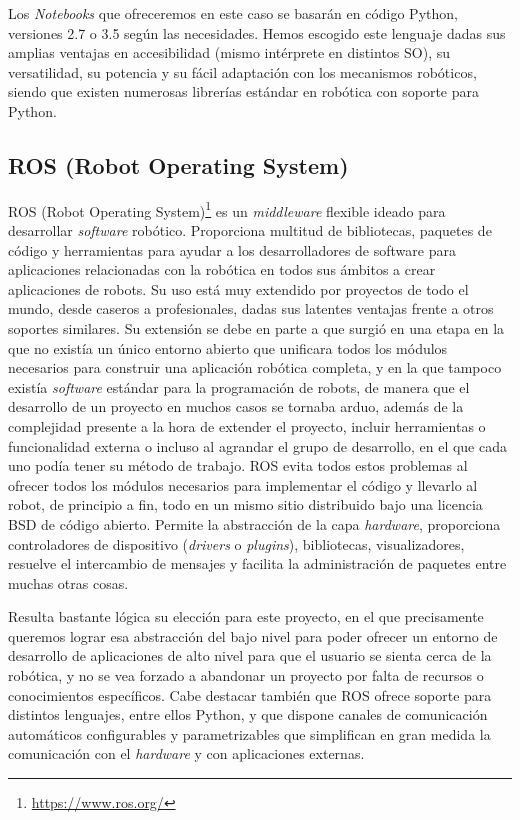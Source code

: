 Los \textit{Notebooks} que ofreceremos en este caso se basarán en código Python, versiones 2.7 o 3.5 según las necesidades. Hemos escogido este lenguaje dadas sus amplias ventajas en accesibilidad (mismo intérprete en distintos SO), su versatilidad, su potencia y su fácil adaptación con los mecanismos robóticos, siendo que existen numerosas librerías estándar en robótica con soporte para Python.

\subsection{ROS (Robot Operating System)}

ROS (Robot Operating System)\footnote{\url{https://www.ros.org/}} es un \textit{middleware} flexible ideado para desarrollar \textit{software} robótico. Proporciona multitud de bibliotecas, paquetes de código y herramientas para ayudar a los desarrolladores de software para aplicaciones relacionadas con la robótica en todos sus ámbitos a crear aplicaciones de robots. Su uso está muy extendido por proyectos de todo el mundo, desde caseros a profesionales, dadas sus latentes ventajas frente a otros soportes similares. Su extensión se debe en parte a que surgió en una etapa en la que no existía un único entorno abierto que unificara todos los módulos necesarios para construir una aplicación robótica completa, y en la que tampoco existía \textit{software} estándar para la programación de robots, de manera que el desarrollo de un proyecto en muchos casos se tornaba arduo, además de la complejidad presente a la hora de extender el proyecto, incluir herramientas o funcionalidad externa o incluso al agrandar el grupo de desarrollo, en el que cada uno podía tener su método de trabajo. ROS evita todos estos problemas al ofrecer todos los módulos necesarios para implementar el código y llevarlo al robot, de principio a fin, todo en un mismo sitio distribuido bajo una licencia BSD de código abierto. Permite la abstracción de la capa \textit{hardware}, proporciona controladores de dispositivo (\textit{drivers} o \textit{plugins}), bibliotecas, visualizadores, resuelve el intercambio de mensajes y facilita la administración de paquetes entre muchas otras cosas.

Resulta bastante lógica su elección para este proyecto, en el que precisamente queremos lograr esa abstracción del bajo nivel para poder ofrecer un entorno de desarrollo de aplicaciones de alto nivel para que el usuario se sienta cerca de la robótica, y no se vea forzado a abandonar un proyecto por falta de recursos o conocimientos específicos. Cabe destacar también que ROS ofrece soporte para distintos lenguajes, entre ellos Python, y que dispone canales de comunicación automáticos configurables y parametrizables que simplifican en gran medida la comunicación con el \textit{hardware} y con aplicaciones externas.


